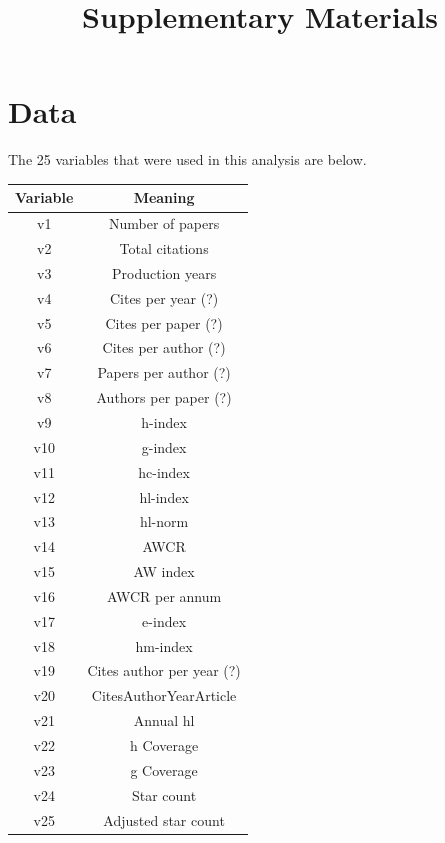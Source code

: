 \documentclass[12pt,a4paper]{article}
\title{Supplementary Materials}
\date{}
\begin{document}
\maketitle

\section{Data}
The 25 variables that were used in this analysis are below.

\begin{tabular}{|c|c|}
\hline 
\textbf{Variable} & \textbf{Meaning} \\ 
\hline 
v1 & Number of papers \\ 
\hline 
v2 & Total citations \\ 
\hline 
v3 & Production years \\ 
\hline 
v4 & Cites per year (?) \\ 
\hline 
v5 & Cites per paper (?) \\ 
\hline 
v6 & Cites per author (?) \\ 
\hline 
v7 & Papers per author (?) \\ 
\hline 
v8 & Authors per paper (?) \\ 
\hline 
v9 & h-index \\ 
\hline 
v10 & g-index \\ 
\hline 
v11 & hc-index \\ 
\hline 
v12 & hl-index \\ 
\hline 
v13 & hl-norm \\ 
\hline 
v14 & AWCR \\ 
\hline 
v15 & AW index \\ 
\hline 
v16 & AWCR per annum \\ 
\hline 
v17 & e-index \\ 
\hline 
v18 & hm-index \\ 
\hline 
v19 & Cites author per year (?) \\ 
\hline 
v20 & CitesAuthorYearArticle \\ 
\hline 
v21 & Annual hl \\ 
\hline 
v22 & h Coverage \\ 
\hline 
v23 & g Coverage \\ 
\hline 
v24 & Star count \\ 
\hline 
v25 & Adjusted star count \\ 
\hline 
\end{tabular}
\begingroup
{}
\endgroup
\end{document}
